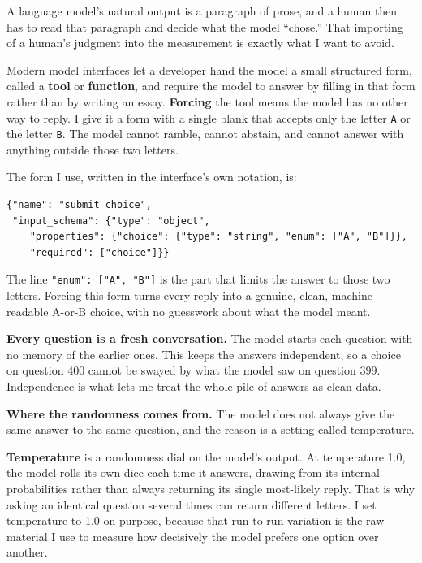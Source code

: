 \documentclass[11pt]{article}
\newcommand{\term}[1]{\textbf{\color{mossdk}#1}}
\begin{document}
A language model's natural output is a paragraph of prose, and a human then has to read that paragraph
and decide what the model ``chose.'' That importing of a human's judgment into the measurement is
exactly what I want to avoid.

\begin{defbox}
Modern model interfaces let a developer hand the model a small structured form, called a \term{tool} or
\term{function}, and require the model to answer by filling in that form rather than by writing an
essay. \term{Forcing} the tool means the model has no other way to reply. I give it a form with a single
blank that accepts only the letter \texttt{A} or the letter \texttt{B}. The model cannot ramble, cannot
abstain, and cannot answer with anything outside those two letters.
\end{defbox}

The form I use, written in the interface's own notation, is:

\begin{lstlisting}[style=schema]
{"name": "submit_choice",
 "input_schema": {"type": "object",
    "properties": {"choice": {"type": "string", "enum": ["A", "B"]}},
    "required": ["choice"]}}
\end{lstlisting}

The line \texttt{"enum": ["A", "B"]} is the part that limits the answer to those two letters. Forcing
this form turns every reply into a genuine, clean, machine-readable A-or-B choice, with no guesswork
about what the model meant.

\textbf{Every question is a fresh conversation.} The model starts each question with no memory of the
earlier ones. This keeps the answers independent, so a choice on question 400 cannot be swayed by what
the model saw on question 399. Independence is what lets me treat the whole pile of answers as clean
data.

\textbf{Where the randomness comes from.} The model does not always give the same answer to the same
question, and the reason is a setting called temperature.

\begin{defbox}[Temperature]
\term{Temperature} is a randomness dial on the model's output. At temperature 1.0, the model rolls its
own dice each time it answers, drawing from its internal probabilities rather than always returning its
single most-likely reply. That is why asking an identical question several times can return different
letters. I set temperature to 1.0 on purpose, because that run-to-run variation is the raw material I
use to measure how decisively the model prefers one option over another.
\end{defbox}
\end{document}
